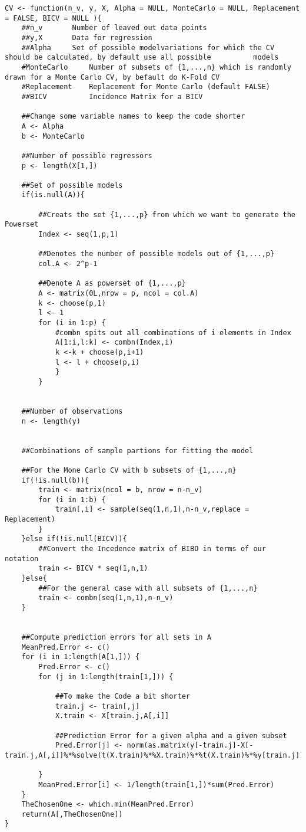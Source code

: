 \documentclass[Research_Module_ES.tex]{subfiles}
\begin{document}
\begin{lstlisting}[title={Cross-Validation Function}]
CV <- function(n_v, y, X, Alpha = NULL, MonteCarlo = NULL, Replacement = FALSE, BICV = NULL ){
	##n_v		Number of leaved out data points
	##y,X		Data for regression
	##Alpha	  	Set of possible modelvariations for which the CV 	     should be calculated, by default use all possible 		    models
	#MonteCarlo   	Number of subsets of {1,...,n} which is randomly 	     drawn for a Monte Carlo CV, by befault do K-Fold CV
	#Replacement  	Replacement for Monte Carlo (default FALSE)
	##BICV          Incidence Matrix for a BICV

	##Change some variable names to keep the code shorter
	A <- Alpha
	b <- MonteCarlo

	##Number of possible regressors
	p <- length(X[1,])                          

	##Set of possible models
	if(is.null(A)){

		##Creats the set {1,...,p} from which we want to generate the Powerset
		Index <- seq(1,p,1)    

		##Denotes the number of possible models out of {1,...,p}
		col.A <- 2^p-1
		
		##Denote A as powerset of {1,...,p}
		A <- matrix(0L,nrow = p, ncol = col.A)      
		k <- choose(p,1)
		l <- 1
		for (i in 1:p) {
			#combn spits out all combinations of i elements in Index 
			A[1:i,l:k] <- combn(Index,i)             
			k <-k + choose(p,i+1)
			l <- l + choose(p,i)
			}
		}


	##Number of observations
	n <- length(y)


	##Combinations of sample partions for fitting the model

	##For the Mone Carlo CV with b subsets of {1,...,n}
	if(!is.null(b)){
		train <- matrix(ncol = b, nrow = n-n_v)
		for (i in 1:b) {
			train[,i] <- sample(seq(1,n,1),n-n_v,replace = Replacement)
		}
	}else if(!is.null(BICV)){
		##Convert the Incedence matrix of BIBD in terms of our notation
		train <- BICV * seq(1,n,1)
	}else{
		##For the general case with all subsets of {1,...,n} 
		train <- combn(seq(1,n,1),n-n_v)
	}


	##Compute prediction errors for all sets in A
	MeanPred.Error <- c()
	for (i in 1:length(A[1,])) {
		Pred.Error <- c()
		for (j in 1:length(train[1,])) {
		
			##To make the Code a bit shorter
			train.j <- train[,j]                 
			X.train <- X[train.j,A[,i]] 
			   
			##Prediction Error for a given alpha and a given subset
			Pred.Error[j] <- norm(as.matrix(y[-train.j]-X[-train.j,A[,i]]%*%solve(t(X.train)%*%X.train)%*%t(X.train)%*%y[train.j]),"2")^2

		}
		MeanPred.Error[i] <- 1/length(train[1,])*sum(Pred.Error)
	}
	TheChosenOne <- which.min(MeanPred.Error)
	return(A[,TheChosenOne])
}
\end{lstlisting}
\end{document}
